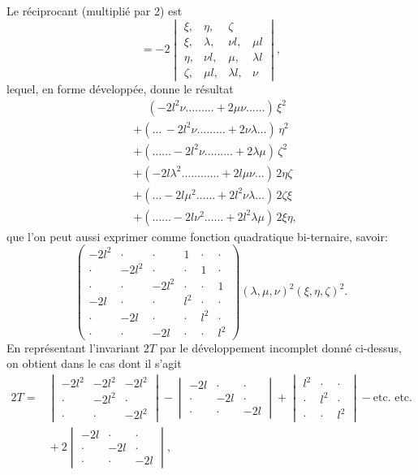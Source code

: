 \documentclass[11pt]{article}
\begin{document}
\noindent Le r\'eciprocant (multipli\'e par 2) est
\[
= -2 \begin{vmatrix}
\xi, & \eta, & \zeta \\
\xi, & \lambda, & \nu l, & \mu l \\
\eta, & \nu l, & \mu, & \lambda l \\
\zeta, & \mu l, & \lambda l, & \nu
\end{vmatrix},
\]
lequel, en forme d\'evelopp\'ee, donne le r\'esultat
\[
\begin{aligned}
&\phantom{+}(-2l^2 \nu \ldots \ldots \ldots + 2\mu \nu \ldots\ldots)\,\xi^2\\
&+(\ldots\,-2l^2 \nu \ldots \ldots \ldots + 2\nu\lambda\ldots)\,\eta^2\\
&+(\ldots \ldots -2l^2 \nu \ldots \ldots \ldots + 2\lambda\mu)\,\zeta^2\\
&+(-2l\lambda^2 \ldots \ldots \ldots \ldots + 2l\mu\nu\ldots)\,2\eta\zeta\\
&+(\ldots -2l\mu^2 \ldots \ldots +2l^2\nu\lambda \ldots)\,2\zeta\xi\\
&+(\ldots \ldots -2l\nu^2 \ldots \ldots +2l^2\lambda\mu)\,2\xi\eta,
\end{aligned}
\]
que l'on peut aussi exprimer comme fonction quadratique bi-ternaire, savoir:
\[
\begin{pmatrix}
-2l^2 & \cdot & \cdot & 1 & \cdot & \cdot \\
\cdot & -2l^2 & \cdot & \cdot & 1 & \cdot \\
\cdot & \cdot & -2l^2 & \cdot & \cdot & 1 \\
-2l & \cdot & \cdot & l^2 & \cdot & \cdot \\
\cdot & -2l & \cdot & \cdot & l^2 & \cdot \\
\cdot & \cdot & -2l & \cdot & \cdot & l^2
\end{pmatrix}(\lambda, \mu, \nu)^2 (\xi, \eta, \zeta)^2.
\]
En repr\'esentant l'invariant $2T$ par le d\'eveloppement incomplet donn\'e ci-dessus, on obtient dans le cas dont il s'agit
\[
\begin{aligned}
2T = {} & \begin{vmatrix}
-2l^2 & -2l^2 & -2l^2 \\
\cdot & -2l^2 & \cdot \\
\cdot & \cdot & -2l^2
\end{vmatrix}
- \begin{vmatrix}
-2l & \cdot & \cdot \\
\cdot & -2l & \cdot \\
\cdot & \cdot & -2l
\end{vmatrix}
+ \begin{vmatrix}
l^2 & \cdot & \cdot \\
\cdot & l^2 & \cdot \\
\cdot & \cdot & l^2
\end{vmatrix}
-\text{etc. etc.}\\
&{} + 2\begin{vmatrix}
-2l & \cdot & \cdot \\
\cdot & -2l & \cdot \\
\cdot & \cdot & -2l
\end{vmatrix},
\end{aligned}
\]
\end{document}
